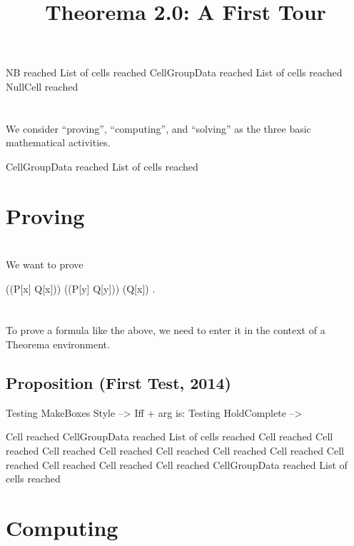 \documentclass{article}
\newcommand{\light}[1]{{\color{lightgray}#1}}
\begin{document}
% 

\title{Theorema 2.0: A First Tour}
\author{}
\date{}
\maketitle

\light{NB reached} \light{List of cells reached} \light{CellGroupData reached} \light{List of cells reached} Null\light{Cell reached} \begingroup \section*{} We consider “proving”, “computing”, and “solving” as the three basic mathematical activities.\endgroup 

\light{CellGroupData reached} \light{List of cells reached} \section{Proving}

\begingroup \section*{} We want to prove\endgroup 

\begin{center}((P[x] \lor Q[x])) \land ((P[y] \Rightarrow Q[y])) \Leftrightarrow (Q[x]) .\end{center}
\begingroup \section*{} To prove a formula like the above, we need to enter it in the context of a Theorema environment.\endgroup 

\begin{openenvironment}
\end{openenvironment}\begin{tmaenvironment}
\subsection{Proposition (First Test, 2014)}
Testing MakeBoxes Style --> Iff + arg is: Testing HoldComplete --> \end{tmaenvironment}
\light{Cell reached} \light{CellGroupData reached} \light{List of cells reached} \light{Cell reached} \light{Cell reached} \light{Cell reached} \light{Cell reached} \light{Cell reached} \light{Cell reached} \light{Cell reached} \light{Cell reached} \light{Cell reached} \light{Cell reached} \light{Cell reached} \light{CellGroupData reached} \light{List of cells reached} \section{Computing}
\end{document}

